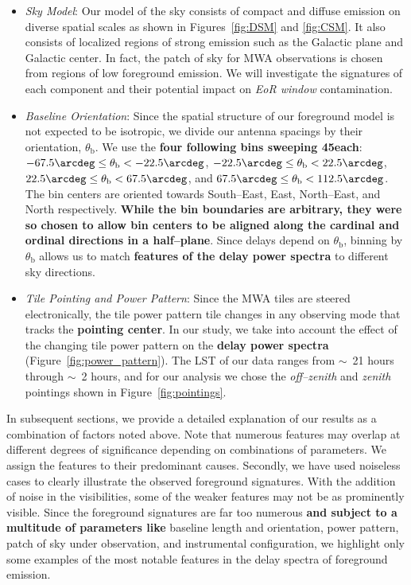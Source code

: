 \documentclass[preprint2,iop,numberedappendix]{emulateapj}
\begin{document}
\begin{itemize}

\item {\it Sky Model}: Our model of the sky consists of compact and diffuse emission on diverse spatial scales as shown in Figures~\ref{fig:DSM} and \ref{fig:CSM}. It also consists of localized regions of strong emission such as the Galactic plane and Galactic center. %
In fact, the patch of sky for MWA observations is chosen from regions of low foreground emission. We will investigate the signatures of each component and their potential impact on {\it EoR window} contamination.

\item {\it Baseline Orientation}: Since the spatial structure of our foreground model is not expected to be isotropic, we divide our antenna spacings by their orientation, $\theta_\textrm{b}$. We use the {\bf four following bins sweeping 45\arcdeg each}: $-67.5\arcdeg\le \theta_\textrm{b} < -22.5\arcdeg$, $-22.5\arcdeg\le \theta_\textrm{b} < 22.5\arcdeg$, $22.5\arcdeg\le \theta_\textrm{b} < 67.5\arcdeg$, and $67.5\arcdeg\le \theta_\textrm{b} < 112.5\arcdeg$. The bin centers are oriented towards South--East, East, North--East, and North respectively. {\bf While the bin boundaries are arbitrary, they were so chosen to allow bin centers to be aligned along the cardinal and ordinal directions in a half--plane}. Since delays depend on $\theta_\textrm{b}$, binning by $\theta_\textrm{b}$ allows us to match {\bf features of the delay power spectra} to different sky directions.

\item {\it Tile Pointing and Power Pattern}: Since the MWA tiles are steered electronically, the tile power pattern tile changes in any observing mode that tracks the {\bf pointing center}. In our study, we take into account the effect of the changing tile power pattern on the {\bf delay power spectra} (Figure~\ref{fig:power_pattern}). The LST of our data ranges from $\sim$~21 hours through $\sim$~2 hours, and for our analysis we chose the {\it off--zenith} and {\it zenith} pointings shown in Figure~\ref{fig:pointings}. %

\end{itemize}

In subsequent sections, we provide a detailed explanation of our results as a combination of factors noted above. Note that numerous features may overlap at different degrees of significance depending on combinations of parameters. We assign the features to their predominant causes. Secondly, we have used noiseless cases to clearly illustrate the observed foreground signatures. With the addition of noise in the visibilities, some of the weaker features may not be as prominently visible. Since the foreground signatures are far too numerous {\bf and subject to a multitude of parameters like} baseline length and orientation, power pattern, patch of sky under observation, and instrumental configuration, we highlight only some examples of the most notable features in the delay spectra of foreground emission.
\end{document}
